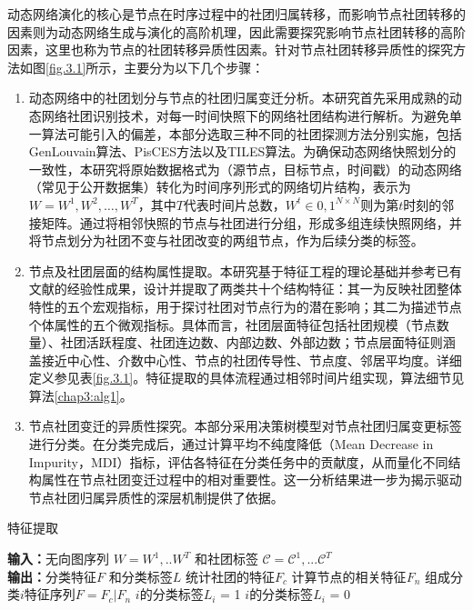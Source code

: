 动态网络演化的核心是节点在时序过程中的社团归属转移，而影响节点社团转移的因素则为动态网络生成与演化的高阶机理，因此需要探究影响节点社团转移的高阶因素，这里也称为节点的社团转移异质性因素。针对节点社团转移异质性的探究方法如图\ref{fig.3.1}所示，主要分为以下几个步骤：

\begin{enumerate}
\item 动态网络中的社团划分与节点的社团归属变迁分析。本研究首先采用成熟的动态网络社团识别技术，对每一时间快照下的网络社团结构进行解析。为避免单一算法可能引入的偏差，本部分选取三种不同的社团探测方法分别实施，包括GenLouvain算法\cite{GenLouvain}、PisCES方法\cite{PisCes}以及TILES算法\cite{rossetti2017tiles}。为确保动态网络快照划分的一致性，本研究将原始数据格式为（源节点，目标节点，时间戳）的动态网络（常见于公开数据集）转化为时间序列形式的网络切片结构，表示为$W={W^1, W^2, \dots, W^T}$，其中$T$代表时间片总数，$W^t \in {0,1}^{N \times N}$则为第$t$时刻的邻接矩阵。通过将相邻快照的节点与社团进行分组，形成多组连续快照网络，并将节点划分为社团不变与社团改变的两组节点，作为后续分类的标签。

\item 节点及社团层面的结构属性提取。本研究基于特征工程的理论基础并参考已有文献的经验性成果\cite{ilhan2016feature}，设计并提取了两类共十个结构特征：其一为反映社团整体特性的五个宏观指标，用于探讨社团对节点行为的潜在影响；其二为描述节点个体属性的五个微观指标。具体而言，社团层面特征包括社团规模（节点数量）、社团活跃程度、社团连边数、内部边数、外部边数；节点层面特征则涵盖接近中心性、介数中心性、节点的社团传导性、节点度、邻居平均度。详细定义参见表\ref{fig.3.1}。特征提取的具体流程通过相邻时间片组实现，算法细节见算法\ref{chap3:alg1}。

\item 节点社团变迁的异质性探究。本部分采用决策树模型对节点社团归属变更标签进行分类。在分类完成后，通过计算平均不纯度降低（Mean Decrease in Impurity，MDI）指标，评估各特征在分类任务中的贡献度，从而量化不同结构属性在节点社团变迁过程中的相对重要性。这一分析结果进一步为揭示驱动节点社团归属异质性的深层机制提供了依据。
\end{enumerate}

\begin{algorithm}[H]
	\caption{特征提取}
	\label{chap3:alg1}
	\begin{algorithmic}[1]
		\STATE \textbf{输入：}\quad 无向图序列 $W = {W}^1,..{W}^T$ 和社团标签 $\mathcal{C} = \mathcal{C}^1,...\mathcal{C}^T$\\
		\STATE \textbf{输出：}\quad 分类特征$F$ 和分类标签$L$
		\STATE 统计社团的特征$F_c$
		\STATE 计算节点的相关特征$F_n$
		\STATE 组成分类$i$特征序列$F = F_c \vert F_n$
		\STATE $i$的分类标签$L_i$ = 1
		\ELSE
		\STATE $i$的分类标签$L_i$ = 0
		\ENDIF
		\ENDFOR
		\ENDFOR
		\ENDFOR
	\end{algorithmic}
\end{algorithm}

